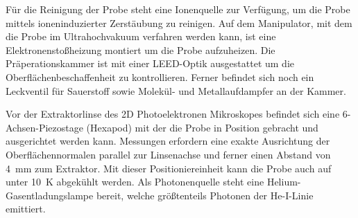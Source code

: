         Für die Reinigung der Probe steht eine Ionenquelle zur Verfügung, um die Probe mittels ioneninduzierter Zerstäubung zu reinigen.
        Auf dem Manipulator, mit dem die Probe im Ultrahochvakuum verfahren werden kann, ist eine Elektronenstoßheizung montiert um die Probe aufzuheizen.
        Die Präperationskammer ist mit einer LEED-Optik ausgestattet um die Oberflächenbeschaffenheit zu kontrollieren.
        Ferner befindet sich noch ein Leckventil für Sauerstoff sowie Molekül- und Metallaufdampfer an der Kammer.
        
        Vor der Extraktorlinse des 2D Photoelektronen Mikroskopes befindet sich eine 6-Achsen-Piezostage (Hexapod) mit der die Probe in Position gebracht und ausgerichtet werden kann.
        Messungen erfordern eine exakte Ausrichtung der Oberflächennormalen parallel zur Linsenachse und ferner einen Abstand von \SI{4}{\milli\meter} zum Extraktor.
        Mit dieser Positioniereinheit kann die Probe auch auf unter \SI{10}{\kelvin} abgekühlt werden.
        Als Photonenquelle steht eine Helium-Gasentladungslampe bereit, welche größtenteils Photonen der He-I-Linie emittiert.